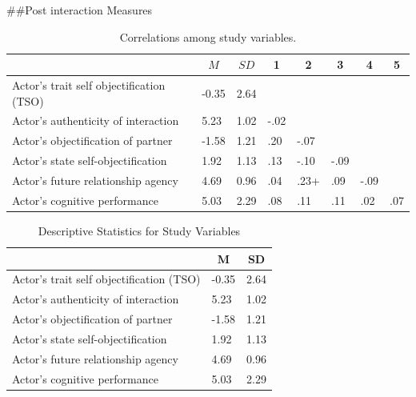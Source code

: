 \documentclass[
  man]{apa6}
\begin{document}
\#\#Post interaction Measures

\begin{table}[tbp]
\begin{center}
\begin{threeparttable}
\caption{\label{tab:corrtable}Correlations among study variables.}
\begin{tabular}{llllllll}
\toprule
 & \multicolumn{1}{c}{$M$} & \multicolumn{1}{c}{$SD$} & \multicolumn{1}{c}{1} & \multicolumn{1}{c}{2} & \multicolumn{1}{c}{3} & \multicolumn{1}{c}{4} & \multicolumn{1}{c}{5}\\
\midrule
Actor's trait self objectification (TSO) & -0.35 & 2.64 &  &  &  &  & \\
Actor's authenticity of interaction & 5.23 & 1.02 & -.02 &  &  &  & \\
Actor's objectification of partner & -1.58 & 1.21 & .20 & -.07 &  &  & \\
Actor's state self-objectification & 1.92 & 1.13 & .13 & -.10 & -.09 &  & \\
Actor's future relationship agency & 4.69 & 0.96 & .04 & .23+ & .09 & -.09 & \\
Actor's cognitive performance & 5.03 & 2.29 & .08 & .11 & .11 & .02 & .07\\
\bottomrule
\end{tabular}
\end{threeparttable}
\end{center}
\end{table}

\begin{table}[tbp]
\begin{center}
\begin{threeparttable}
\caption{\label{tab:descriptives}Descriptive Statistics for Study Variables}
\begin{tabular}{lll}
\toprule
 & \multicolumn{1}{c}{M} & \multicolumn{1}{c}{SD}\\
\midrule
Actor's trait self objectification (TSO) & -0.35 & 2.64\\
Actor's authenticity of interaction & 5.23 & 1.02\\
Actor's objectification of partner & -1.58 & 1.21\\
Actor's state self-objectification & 1.92 & 1.13\\
Actor's future relationship agency & 4.69 & 0.96\\
Actor's cognitive performance & 5.03 & 2.29\\
\bottomrule
\end{tabular}
\end{threeparttable}
\end{center}
\end{table}
\end{document}
